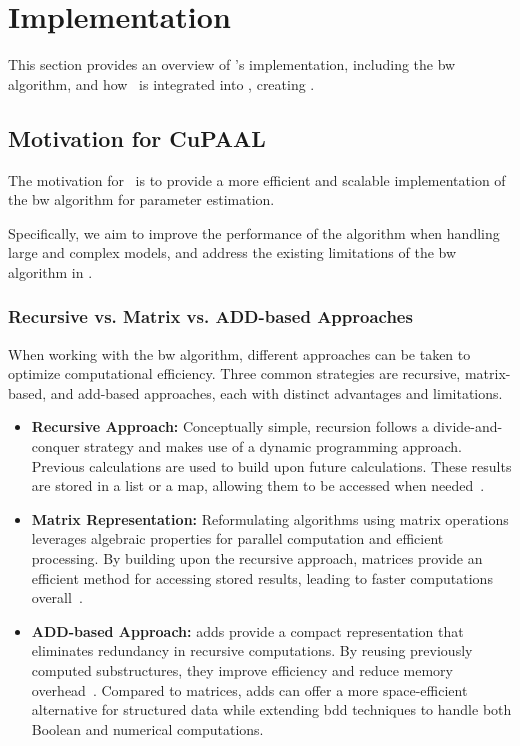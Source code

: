 \section{Implementation}\label{sec:implementation}
This section provides an overview of \Cupaal's implementation, including the \gls{bw} algorithm, and how \Cupaal\ is integrated into \Jajapy, creating \JajapyTwo.

\subsection{Motivation for CuPAAL}\label{subsec:motivation-for-cupaal}
The motivation for \Cupaal\ is to provide a more efficient and scalable implementation of the \gls{bw} algorithm for parameter estimation.

Specifically, we aim to improve the performance of the algorithm when handling large and complex models, and address the existing limitations of the \gls{bw} algorithm in \Jajapy.

\subsubsection{Recursive vs. Matrix vs. ADD-based Approaches}\label{subsec:approaches}
When working with the \gls{bw} algorithm, different approaches can be taken to optimize computational efficiency.
Three common strategies are recursive, matrix-based, and \gls{add}-based approaches, each with distinct advantages and limitations.


\begin{itemize}
    \item \textbf{Recursive Approach:} Conceptually simple, recursion follows a divide-and-conquer strategy and makes use of a dynamic programming approach. Previous calculations are used to build upon future calculations. These results are stored in a list or a map, allowing them to be accessed when needed~\cite[Chapter 4]{cormen2022introduction}.
    \item \textbf{Matrix Representation:} Reformulating algorithms using matrix operations leverages algebraic properties for parallel computation and efficient processing.
          By building upon the recursive approach, matrices provide an efficient method for accessing stored results, leading to faster computations overall~\cite[Chapter 4, 15 \& 28]{cormen2022introduction}.
    \item \textbf{ADD-based Approach:} \glspl{add} provide a compact representation that eliminates redundancy in recursive computations.
          By reusing previously computed substructures, they improve efficiency and reduce memory overhead~\cite{bahar1997algebric}.
          Compared to matrices, \glspl{add} can offer a more space-efficient alternative for structured data while extending \gls{bdd} techniques to handle both Boolean and numerical computations.
\end{itemize}


